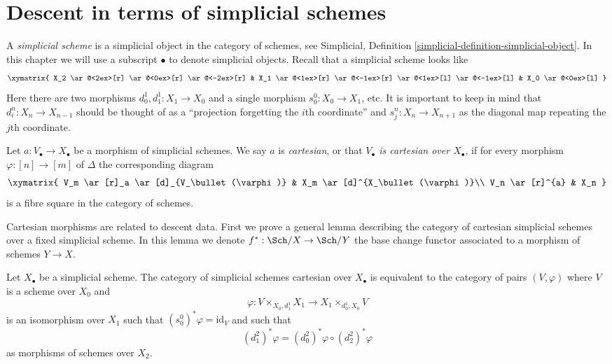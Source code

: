 \section{Descent in terms of simplicial schemes}
\label{section-simplicial}

\noindent
A {\it simplicial scheme} is a simplicial object in the category of schemes,
see Simplicial, Definition \ref{simplicial-definition-simplicial-object}.
In this chapter we will use a subscript $\bullet$ to denote simplicial
objects. Recall that a simplicial scheme looks like
$$
\xymatrix{
X_2
\ar@<2ex>[r]
\ar@<0ex>[r]
\ar@<-2ex>[r]
&
X_1
\ar@<1ex>[r]
\ar@<-1ex>[r]
\ar@<1ex>[l]
\ar@<-1ex>[l]
&
X_0
\ar@<0ex>[l]
}
$$
Here there are two morphisms $d^1_0, d^1_1 : X_1 \to X_0$
and a single morphism $s^0_0 : X_0 \to X_1$, etc.
It is important to keep in mind that $d^n_i : X_n \to X_{n - 1}$
should be thought of as a ``projection forgetting the
$i$th coordinate'' and $s^n_j : X_n \to X_{n + 1}$ as the diagonal
map repeating the $j$th coordinate.

\begin{definition}
\label{definition-cartesian-morphism}
Let $a : V_\bullet \to X_\bullet$ be a morphism of simplicial schemes.
We say $a$ is {\it cartesian}, or that {\it $V_\bullet$ is cartesian over
$X_\bullet$}, if for every morphism
$\varphi : [n] \to [m]$ of $\Delta$ the corresponding diagram
$$
\xymatrix{
V_m \ar[r]_a \ar[d]_{V_\bullet(\varphi)} & X_m \ar[d]^{X_\bullet(\varphi)}\\
V_n \ar[r]^{a} & X_n
}
$$
is a fibre square in the category of schemes.
\end{definition}

\noindent
Cartesian morphisms are related to descent data. First we prove a general
lemma describing the category of cartesian simplicial schemes over a
fixed simplicial scheme. In this lemma we denote $f^* : \Sch/X \to \Sch/Y$
the base change functor associated to a morphism of schemes $Y \to X$.

\begin{lemma}
\label{lemma-characterize-cartesian-schemes}
Let $X_\bullet$ be a simplicial scheme.
The category of simplicial schemes cartesian over $X_\bullet$
is equivalent to the category of pairs $(V, \varphi)$
where $V$ is a scheme over $X_0$ and
$$
\varphi :
V \times_{X_0, d^1_1} X_1
\longrightarrow
X_1 \times_{d^1_0, X_0} V
$$
is an isomorphism over $X_1$ such that
$(s_0^0)^*\varphi = \text{id}_V$ and such that
$$
(d^2_1)^*\varphi = (d^2_0)^*\varphi \circ (d^2_2)^*\varphi
$$
as morphisms of schemes over $X_2$.
\end{lemma}

